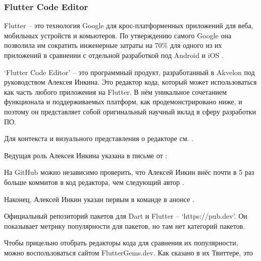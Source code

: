 \subsubsection{Flutter Code Editor}
\label{subsubsec:ContributionsFlutter}


Flutter -- это технология Google для крос-платформенных приложений для веба, мобильных устройств и комьютеров.
По утверждению самого Google она позволила им сократить инженерные затраты на 70\%
для одного из их приложений в сравнении с отдельной разработкой под Android и iOS .

`Flutter Code Editor' -- это программный продукт, разработанный в Akvelon под руководством Алексея Инкина.
Это редактор кода, который может использоваться как часть любого приложения на Flutter.
В нём уникальное сочетанием функционала и поддерживаемых платформ, как продемонстрировано ниже,
и поэтому он представляет собой оригинальный научный вклад в сферу разработки ПО.

Для контекста и визуального представления о редакторе см. .



Ведущая роль Алексея Инкина указана в письме от \MrAkvelonT:


На GitHub можно независимо проверить, что Алексей Инкин внёс почти в 5 раз больше коммитов
в код редактора, чем следующий автор .

Наконец, Алексей Инкин указан первым в команде в анонсе
.



Официальный репозиторий пакетов для Dart и Flutter -- `https://pub.dev'.
Он показывает метрику популярности для пакетов, но там нет категорий пакетов.

Чтобы прицельно отобрать редакторы кода для сравнения их популярности,
можно воспользоваться сайтом FlutterGems.dev.
Как сказано в их Твиттере, это


